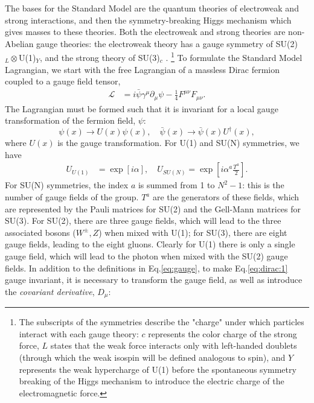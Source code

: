 \documentclass[a4paper,12pt]{article}
\begin{document}
The bases for the Standard Model are the quantum theories of electroweak and strong interactions, and then the symmetry-breaking Higgs mechanism which gives masses to these theories.
Both the electroweak and strong theories are non-Abelian gauge theories: the electroweak theory has a gauge symmetry of SU(2)$_{L}\otimes$U(1)$_Y$, and the strong theory of SU(3)$_{c}$ \cite{bail}.
\hspace{-9pt}\footnote{The subscripts of the symmetries describe the "charge" under which particles interact with each gauge theory: $c$ represents the color charge of the strong force, $L$ states that the weak force interacts only with left-handed doublets (through which the weak isospin will be defined analogous to spin), and $Y$ represents the weak hypercharge of U(1) before the spontaneous symmetry breaking of the Higgs mechanism to introduce the electric charge of the electromagnetic force.\cite{schwartz}}
\hspace{-5pt}To formulate the Standard Model Lagrangian, we start with the free Lagrangian of a massless Dirac fermion coupled to a gauge field tensor,
\begin{align}
    \label{eq:dirac:1}
    \mathcal{L} &= i\bar{\psi}\gamma^\mu\partial_\mu\psi - \frac14F^{\mu\nu}F_{\mu\nu}.
\end{align}
The Lagrangian must be formed such that it is invariant for a local gauge transformation of the fermion field, $\psi$:
\begin{equation}
    \label{eq:local}
    \psi(x)\to U(x)\psi(x),\quad \bar{\psi}(x)\to\bar{\psi}(x)U^\dagger(x),
\end{equation}
where $U(x)$ is the gauge transformation.
For U(1) and SU(N) symmetries, we have
\begin{align}
    \label{eq:gauge} 
    U_{U(1)} &= \exp\left[i\alpha\right],\quad U_{SU(N)} = \exp\left[i\alpha^a\frac{T^a}{2}\right].
\end{align}
For SU(N) symmetries, the index $a$ is summed from 1 to $N^2-1$: this is the number of gauge fields of the group.
$T^a$ are the generators of these fields, which are represented by the Pauli matrices for SU(2) and the Gell-Mann matrices for SU(3).
For SU(2), there are three gauge fields, which will lead to the three associated bosons ($W^{\pm},Z$) when mixed with U(1); for SU(3), there are eight gauge fields, leading to the eight gluons.
Clearly for U(1) there is only a single gauge field, which will lead to the photon when mixed with the SU(2) gauge fields.
In addition to the definitions in Eq.\eqref{eq:gauge}, to make Eq.\eqref{eq:dirac:1} gauge invariant, it is necessary to transform the gauge field, as well as introduce the \textit{covariant derivative}, $D_\mu$:
\end{document}
